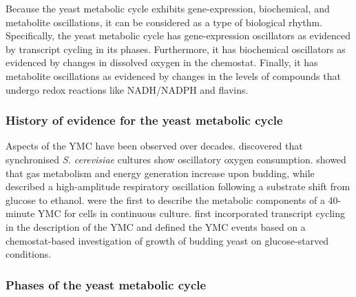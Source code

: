Because the yeast metabolic cycle exhibits gene-expression, biochemical, and metabolite oscillations, it can be considered as a type of biological rhythm.
Specifically, the yeast metabolic cycle has gene-expression oscillators as evidenced by transcript cycling in its phases.
Furthermore, it has biochemical oscillators as evidenced by changes in dissolved oxygen in the chemostat.
Finally, it has metabolite oscillations as evidenced by changes in the levels of compounds that undergo redox reactions like NADH/NADPH and flavins.


\subsubsection{History of evidence for the yeast metabolic cycle}
\label{subsubsec:intro-ymc-definition-history}

Aspects of the YMC have been observed over decades.
\textcite{nosohSYNCHRONIZATIONBUDDINGCYCLE1962} discovered that synchronised \textit{S. cerevisiae} cultures show oscillatory oxygen consumption.
\textcite{kasparvonmeyenburgEnergeticsBuddingCycle1969} showed that gas metabolism and energy generation increase upon budding, while \textcite{mochanRespiratoryOscillationsAdapting1973} described a high-amplitude respiratory oscillation following a substrate shift from glucose to ethanol.
\textcite{satroutdinovOscillatoryMetabolismSaccharomyces1992} were the first to describe the metabolic components of a 40-minute YMC for cells in continuous culture.
\textcite{tuLogicYeastMetabolic2005}
first incorporated transcript cycling in the description of the YMC and defined the YMC events
based on a chemostat-based investigation of growth of budding yeast on glucose-starved conditions.


\subsubsection{Phases of the yeast metabolic cycle}
\label{subsubsec:intro-ymc-definition-phases}

